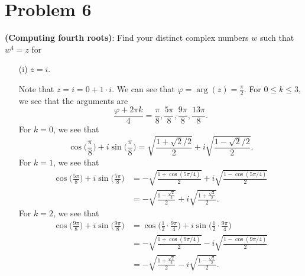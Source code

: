 \documentclass[a4paper]{article}
\begin{document}
    \section*{Problem 6} \textbf{(Computing fourth roots)}: Find your distinct complex numbers \( w  \) such that \( w^{4} = z  \) for 
        \begin{enumerate}
            \item[(i)] \( z = i  \).
                \begin{solution}
                Note that \( z  = i = 0  + 1 \cdot i  \). We can see that \( \varphi =  \arg(z) = \frac{ \pi  }{  2 }  \). For \( 0 \leq k \leq 3   \), we see that the arguments are 
                \[  \frac{  \varphi + 2 \pi k  }{ 4  }  = \frac{ \pi }{ 8 }, \frac{ 5 \pi  }{ 8  }, \frac{ 9 \pi  }{ 8  }, \frac{  13 \pi  }{ 8  }.   \]
                For \( k = 0  \), we see that 
                \[    \cos \Big(  \frac{  \pi   }{ 8 }   \Big) + i \sin \Big(  \frac{ \pi  }{ 8  }  \Big) = \sqrt{ \frac{ 1 + \sqrt{ 2 } / 2  }{ 2  }  } + i \sqrt{ \frac{  1 - \sqrt{ 2 } / 2  }{ 2  } }. \]
            For \(  k = 1  \), we see that 
            \begin{align*}
            \cos \Big( \frac{ 5 \pi  }{ 8  } \Big) + i \sin \Big( \frac{ 5 \pi  }{ 8  }  \Big) &= - \sqrt{ \frac{ 1 + \cos(5 \pi /4) }{ 2  }  } + i \sqrt{ \frac{ 1 - \cos (5 \pi /4) }{ 2 }  }     \\
                                                                                               &= - \sqrt{ \frac{ 1 - \frac{ \sqrt{ 2 }  }{ 2 }   }{ 2 }  } + i \sqrt{ \frac{ 1 + \frac{ \sqrt{ 2 }  }{ 2 }   }{ 2 }  }. 
        \end{align*}
        For \( k = 2  \), we see that 
        \begin{align*}
            \cos \Big(  \frac{  9 \pi  }{ 8  }  \Big) + i \sin \Big(  \frac{ 9 \pi  }{ 8  }  \Big) &= \cos \Big(  \frac{ 1 }{ 2 }  \cdot \frac{  9 \pi  }{ 4  }  \Big) + i \sin \Big(  \frac{ 1 }{ 2 }  \cdot \frac{ 9 \pi  }{ 4 }  \Big) \\
                                                                                                   &= -\sqrt{ \frac{ 1 + \cos(9 \pi /4) }{2  }  }  - i \sqrt{ \frac{ 1 - \cos(9\pi/4) }{ 2  }  } \\
                                                                                                   &= -\sqrt{  \frac{ 1 + \frac{ \sqrt{ 2 }  }{ 2 }  }{ 2 }     } - i \sqrt{  \frac{ 1 - \frac{ \sqrt{ 2 }  }{ 2 }  }{ 2 }  }. 
        \end{align*}

\end{solution}
\end{enumerate}
\end{document}
